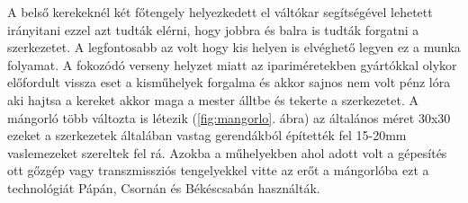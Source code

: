\documentclass[fontsize=12pt, appendixprefix=true]{scrreprt}
\begin{document}
A belső kerekeknél két főtengely helyezkedett el váltókar segítségével lehetett irányitani ezzel azt tudták elérni, hogy jobbra és balra is tudták forgatni a szerkezetet. A legfontosabb az volt hogy kis helyen is elvéghető legyen ez a munka folyamat. A fokozódó verseny helyzet miatt az ipariméretekben gyártókkal olykor előfordult vissza eset a kisműhelyek forgalma és akkor sajnos nem volt pénz lóra aki hajtsa a kereket akkor maga a mester álltbe és tekerte a szerkezetet. A mángorló több változta is létezik (\ref{fig:mangorlo}. ábra) az általános méret 30x30  ezeket a szerkezetek általában vastag gerendákból építették fel 15-20mm vaslemezeket szereltek fel rá.
Azokba a műhelyekben ahol adott volt a gépesítés ott gőzgép vagy transzmissziós tengelyekkel vitte az erőt a mángorlóba ezt a technológiát Pápán, Csornán és  Békéscsabán használták.
\end{document}
